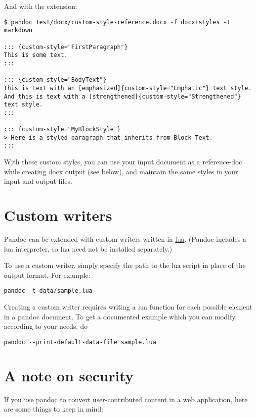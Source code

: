 \documentclass[
  12pt,
  a4paper,
]{article}
\begin{document}
And with the extension:

\begin{verbatim}
$ pandoc test/docx/custom-style-reference.docx -f docx+styles -t markdown

::: {custom-style="FirstParagraph"}
This is some text.
:::

::: {custom-style="BodyText"}
This is text with an [emphasized]{custom-style="Emphatic"} text style.
And this is text with a [strengthened]{custom-style="Strengthened"}
text style.
:::

::: {custom-style="MyBlockStyle"}
> Here is a styled paragraph that inherits from Block Text.
:::
\end{verbatim}

With these custom styles, you can use your input document as a reference-doc while creating docx
output (see below), and maintain the same styles in your input and output files.

\hypertarget{custom-writers}{%
\section{Custom writers}\label{custom-writers}}

Pandoc can be extended with custom writers written in \href{http://www.lua.org}{lua}. (Pandoc
includes a lua interpreter, so lua need not be installed separately.)

To use a custom writer, simply specify the path to the lua script in place of the output format.
For example:

\begin{verbatim}
pandoc -t data/sample.lua
\end{verbatim}

Creating a custom writer requires writing a lua function for each possible element in a pandoc
document. To get a documented example which you can modify according to your needs, do

\begin{verbatim}
pandoc --print-default-data-file sample.lua
\end{verbatim}

\hypertarget{a-note-on-security}{%
\section{A note on security}\label{a-note-on-security}}

If you use pandoc to convert user-contributed content in a web application, here are some things
to keep in mind:
\end{document}
